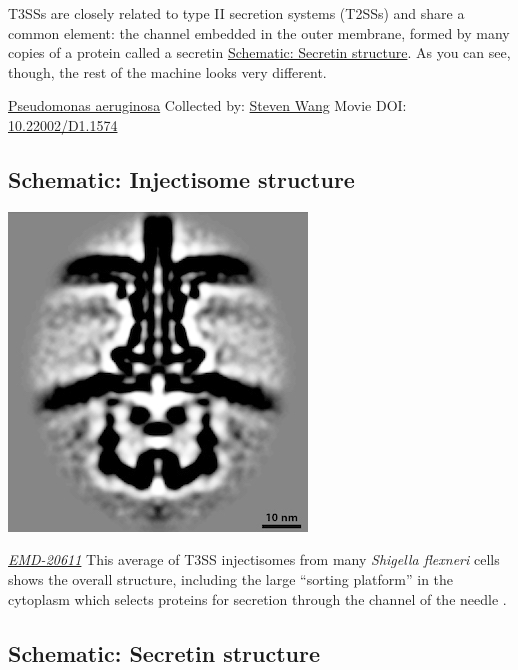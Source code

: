 \documentclass[]{tufte-book}
\begin{document}
T3SSs are closely related to type II secretion systems (T2SSs) and share a common element: the channel embedded in the outer membrane, formed by many copies of a protein called a secretin \protect\hyperlink{Secretin_structure}{Schematic: Secretin structure}. As you can see, though, the rest of the machine looks very different.



\hypertarget{htmlwidget-b349a152904d98dc473a}{}

\label{fig:9-4}\protect\hyperlink{tree}{Pseudomonas aeruginosa} Collected by: \protect\hyperlink{steven_wang}{Steven Wang} Movie DOI: \href{https://doi.org/10.22002/D1.1574}{10.22002/D1.1574}

\hypertarget{Injectisome_structure}{%
\subsection*{Schematic: Injectisome structure}\label{Injectisome_structure}}

\includegraphics{img/schematics/9_4_1}

\href{https://www.ebi.ac.uk/pdbe/entry/emdb/EMD-20611}{\emph{EMD-20611}}
This average of T3SS injectisomes from many \emph{Shigella flexneri} cells shows the overall structure, including the large ``sorting platform'' in the cytoplasm which selects proteins for secretion through the channel of the needle \citep{tachiyama2019}.

\hypertarget{Secretin_structure}{%
\subsection*{Schematic: Secretin structure}\label{Secretin_structure}}
\end{document}
